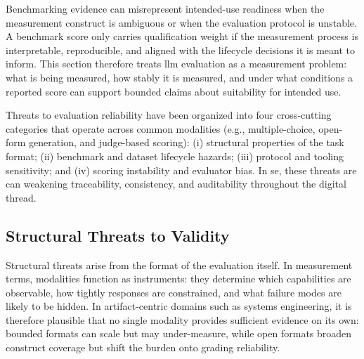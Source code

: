 Benchmarking evidence can misrepresent intended-use readiness when the measurement construct is ambiguous or when the evaluation protocol is unstable. A benchmark score only carries qualification weight if the measurement process is interpretable, reproducible, and aligned with the lifecycle decisions it is meant to inform. This section therefore treats \ac{llm} evaluation as a measurement problem: what is being measured, how stably it is measured, and under what conditions a reported score can support bounded claims about suitability for intended use.

Threats to evaluation reliability have been organized into four cross-cutting categories that operate across common modalities (e.g., multiple-choice, open-form generation, and judge-based scoring): (i) structural properties of the task format; (ii) benchmark and dataset lifecycle hazards; (iii) protocol and tooling sensitivity; and (iv) scoring instability and evaluator bias. In \ac{se}, these threats are can weakening traceability, consistency, and auditability throughout the digital thread. 




\subsection{Structural Threats to Validity}
\label{subsec:ch2_structural_threats}



Structural threats arise from the format of the evaluation itself. In measurement terms, modalities function as instruments: they determine which capabilities are observable, how tightly responses are constrained, and what failure modes are likely to be hidden. In artifact-centric domains such as systems engineering, it is therefore plausible that no single modality provides sufficient evidence on its own: bounded formats can scale but may under-measure, while open formats broaden construct coverage but shift the burden onto grading reliability.

